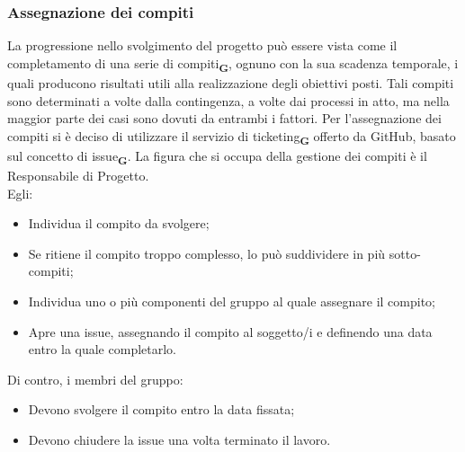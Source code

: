 \subsubsection{Assegnazione dei compiti}
La progressione nello svolgimento del progetto può essere vista come il completamento di una serie di compiti\textsubscript{\textbf{G}}, ognuno con la sua scadenza temporale, i quali producono risultati utili alla realizzazione degli obiettivi posti. Tali compiti sono determinati a volte dalla contingenza, a volte dai processi in atto, ma nella maggior parte dei casi sono dovuti da entrambi i fattori. Per l’assegnazione dei compiti si è deciso di utilizzare il servizio di ticketing\textsubscript{\textbf{G}} offerto da GitHub, basato sul concetto di issue\textsubscript{\textbf{G}}. La figura che si occupa della gestione dei compiti è il Responsabile di Progetto.\\
Egli:
\begin {itemize}
    \item Individua il compito da svolgere;
    \item Se ritiene il compito troppo complesso, lo può suddividere in più sotto-compiti;
    \item Individua uno o più componenti del gruppo al quale assegnare il compito;
    \item Apre una issue, assegnando il compito al soggetto/i e definendo una data entro la quale completarlo.
\end {itemize}
Di contro, i membri del gruppo:
\begin {itemize}
    \item Devono svolgere il compito entro la data fissata;
    \item Devono chiudere la issue una volta terminato il lavoro.
\end {itemize}
